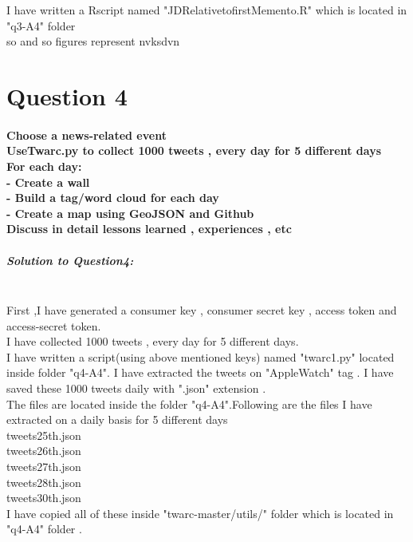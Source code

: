 \documentclass[12pt]{Report}
\begin{document}
I have written a Rscript named "JDRelativetofirstMemento.R" which is located in "q3-A4" folder \\

so and so figures represent nvksdvn


\section{Question 4\\}

\paragraph{Choose a news-related event\\ UseTwarc.py to collect 1000 tweets , every day for 5 different days \\For each day:\\ - Create a wall \\ - Build a tag/word cloud for each day \\ - Create a map using GeoJSON and Github\\ Discuss in detail lessons learned , experiences , etc\\}

\subparagraph{Solution to Question4: \\\\}
First ,I have generated a consumer key , consumer secret key , access token and access-secret token.\\
 I have collected 1000 tweets  , every day for 5 different days.\\
I have written a script(using above mentioned keys)  named "twarc1.py" located inside folder "q4-A4". I have extracted the tweets on "AppleWatch" tag . I have saved these 1000 tweets daily with ".json" extension .\\
The files are located inside the folder "q4-A4".Following are the files I have extracted on a daily basis for 5 different days\\ 

tweets25th.json \\
  tweets26th.json \\
  tweets27th.json \\
  tweets28th.json \\
  tweets30th.json \\

I have copied all of these inside "twarc-master/utils/" folder which is located in "q4-A4" folder .
\end{document}
